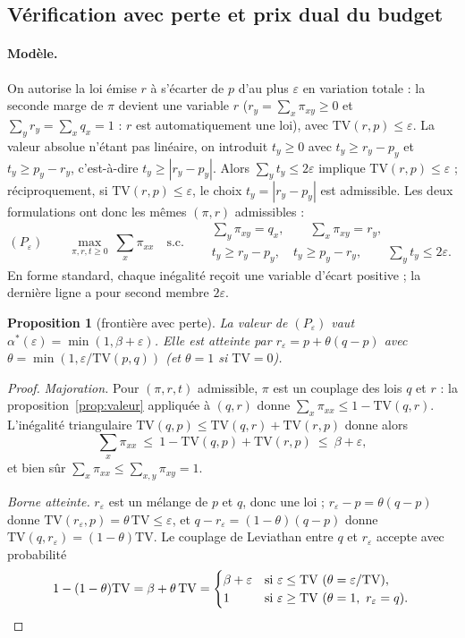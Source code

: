\documentclass[11pt,a4paper]{article}
\newcommand{\TV}{\mathrm{TV}}
\theoremstyle{plain}
\newtheorem{proposition}{Proposition}
\theoremstyle{definition}
\begin{document}
\subsection{Vérification avec perte et prix dual du budget}\label{sec:perte}
\paragraph{Modèle.} On autorise la loi émise $r$ à s'écarter de $p$ d'au plus $\varepsilon$ en variation totale : la seconde marge de $\pi$ devient une variable $r$ ($r_y=\sum_x\pi_{xy}\ge0$ et $\sum_yr_y=\sum_xq_x=1$ : $r$ est automatiquement une loi), avec $\TV(r,p)\le\varepsilon$. La valeur absolue n'étant pas linéaire, on introduit $t_y\ge0$ avec $t_y\ge r_y-p_y$ et $t_y\ge p_y-r_y$, c'est-à-dire $t_y\ge|r_y-p_y|$. Alors $\sum_yt_y\le2\varepsilon$ implique $\TV(r,p)\le\varepsilon$ ; réciproquement, si $\TV(r,p)\le\varepsilon$, le choix $t_y=|r_y-p_y|$ est admissible. Les deux formulations ont donc les mêmes $(\pi,r)$ admissibles :
\[(P_\varepsilon)\qquad \max_{\pi,r,t\ge0}\ \sum_x\pi_{xx}\quad\text{s.c.}\quad
\begin{aligned}&\textstyle\sum_y\pi_{xy}=q_x,\qquad \sum_x\pi_{xy}=r_y,\\
&t_y\ge r_y-p_y,\quad t_y\ge p_y-r_y,\qquad \textstyle\sum_yt_y\le2\varepsilon.\end{aligned}\]
En forme standard, chaque inégalité reçoit une variable d'écart positive ; la dernière ligne a pour second membre $2\varepsilon$.

\begin{proposition}[frontière avec perte]\label{prop:perte}
La valeur de $(P_\varepsilon)$ vaut $\alpha^*(\varepsilon)=\min(1,\beta+\varepsilon)$. Elle est atteinte par $r_\varepsilon=p+\theta(q-p)$ avec $\theta=\min(1,\varepsilon/\TV(p,q))$ (et $\theta=1$ si $\TV=0$).
\end{proposition}

\begin{proof}
\emph{Majoration.} Pour $(\pi,r,t)$ admissible, $\pi$ est un couplage des lois $q$ et $r$ : la proposition~\ref{prop:valeur} appliquée à $(q,r)$ donne $\sum_x\pi_{xx}\le1-\TV(q,r)$. L'inégalité triangulaire $\TV(q,p)\le\TV(q,r)+\TV(r,p)$ donne alors
\[\sum_x\pi_{xx}\ \le\ 1-\TV(q,p)+\TV(r,p)\ \le\ \beta+\varepsilon,\]
et bien sûr $\sum_x\pi_{xx}\le\sum_{x,y}\pi_{xy}=1$.

\emph{Borne atteinte.} $r_\varepsilon$ est un mélange de $p$ et $q$, donc une loi ; $r_\varepsilon-p=\theta(q-p)$ donne $\TV(r_\varepsilon,p)=\theta\,\TV\le\varepsilon$, et $q-r_\varepsilon=(1-\theta)(q-p)$ donne $\TV(q,r_\varepsilon)=(1-\theta)\TV$. Le couplage de Leviathan entre $q$ et $r_\varepsilon$ accepte avec probabilité
\[1-(1-\theta)\TV=\beta+\theta\,\TV=\begin{cases}\beta+\varepsilon&\text{si }\varepsilon\le\TV\ (\theta=\varepsilon/\TV),\\1&\text{si }\varepsilon\ge\TV\ (\theta=1,\ r_\varepsilon=q).\end{cases}\qedhere\]
\end{proof}
\end{document}
